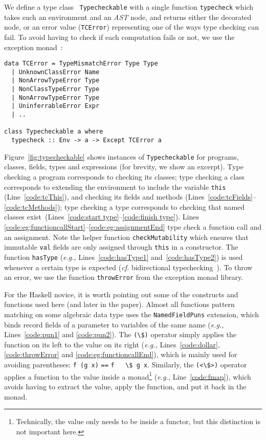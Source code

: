 \documentclass[sigplan,screen]{acmart}
\makeatletter
\newcommand{\ec}[1]{\lstinline[style=encore,breaklines=true,basicstyle=\fontsize{9}{9}\tt]@#1@}
\newcommand{\astt}[0]{\textit{AST}}
\makeatother
\begin{document}
We define a type class~\cite{TypeClasses} \ec{Typecheckable} with a single function
\ec{typecheck} which takes such an environment and an \astt{} node, and
returns either the decorated node, or an error value
(\ec{TCError}) representing one of the ways type checking can
fail. To avoid having to check if each computation fails or not,
we use the exception
monad~\cite{exception-monad}:

\begin{minipage}[t]{\linewidth}
\begin{lstlisting}[style=encore]
data TCError = TypeMismatchError Type Type
  | UnknownClassError Name
  | NonArrowTypeError Type
  | NonClassTypeError Type
  | NonArrowTypeError Type
  | UninferrableError Expr
  | ..

class Typecheckable a where
  typecheck :: Env -> a -> Except TCError a
\end{lstlisting}
\end{minipage}

Figure~\ref{fig:typecheckable} shows instances of
\ec{Typecheckable} for programs, classes, fields, types and expressions
(for brevity, we show an excerpt).
%
Type checking a program corresponds to checking its classes;
%
type checking a class corresponds to extending the environment to include the
variable \ec{this} (Line~\ref{code:tcThis}), and checking its
fields and methods (Lines~\ref{code:tcFields}--\ref{code:tcMethods});
%
type checking a type corresponds to checking that named classes
exist~(Lines~\ref{code:start type}--\ref{code:finish type}).
%
Lines \ref{code:eg:functioncallStart}--\ref{code:eg:assignmentEnd}
type check a function call and an assignment.
%
Note the helper function \ec{checkMutability} which ensures that
immutable \ec{val} fields are only assigned through \ec{this} in a
constructor.
%
The function
\ec{hasType} (\emph{e.g.}, Lines~\ref{code:hasType1} and~\ref{code:hasType2}) is used
whenever a certain type is expected (\emph{cf.} bidirectional
typechecking~\cite{bidirectional}). To throw an error, we use the
function \ec{throwError} from the exception monad library.

For the Haskell novice, it is worth pointing out some of the
constructs and functions used here (and later in the paper).
%
Almost all functions pattern matching on some algebraic data type
uses the \ec{NamedFieldPuns} extension, which binds record fields
of a parameter to variables of the same name (\emph{e.g.,}
Lines~\ref{code:pun1} and \ref{code:pun2}).
%
%
The \ec{(\$)} operator simply applies the function on its left to
the value on its right (\emph{e.g.,} Lines~\ref{code:dollar},
\ref{code:throwError} and \ref{code:eg:functioncallEnd}), which is
mainly used for avoiding parentheses: \ec{f (g x)} \ec{==} \ec{f
  \$ g x}.
%
Similarly, the \ec{(<\$>)} operator applies a function to the
value inside a monad\footnote{Technically, the value only needs to
  be inside a functor, but this distinction is not important
  here.} (\emph{e.g.,} Line~\ref{code:fmap}), which avoids having
to extract the value, apply the function, and put it back in the
monad.
\end{document}
